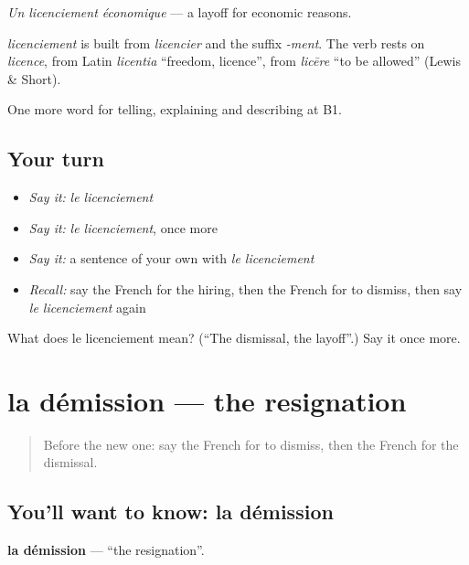 \emph{Un licenciement économique} — a layoff for economic reasons.

\begin{cousinweb}
\emph{licenciement} is built from \emph{licencier} and the suffix \emph{-ment}. The verb rests on \emph{licence}, from Latin \emph{licentia} \textquotedblleft{}freedom, licence\textquotedblright{}, from \emph{licēre} \textquotedblleft{}to be allowed\textquotedblright{} (Lewis \& Short).
\end{cousinweb}

\begin{grammarlens}[title={What you've built}]
One more word for telling, explaining and describing at B1.
\end{grammarlens}

\subsection*{Your turn}
\begin{itemize}
\raggedright
  \item \emph{Say it:} \emph{le licenciement}
  \item \emph{Say it:} \emph{le licenciement}, once more
  \item \emph{Say it:} a sentence of your own with \emph{le licenciement}
  \item \emph{Recall:} say the French for the hiring, then the French for to dismiss, then say \emph{le licenciement} again
\end{itemize}

\begin{tcolorbox}[breakable,colback=teal!4,colframe=teal!35!black,title={Before you move on}]
What does le licenciement mean? (\textquotedblleft{}The dismissal, the layoff\textquotedblright{}.) Say it once more.
\end{tcolorbox}
\section[la démission]{la démission — the resignation}

\label{lesson:FR-C355-demission}



\begin{quote}
Before the new one: say the French for to dismiss, then the French for the dismissal.
\end{quote}

\subsection*{You'll want to know: la démission}
\textbf{la démission} — \textquotedblleft{}the resignation\textquotedblright{}.

